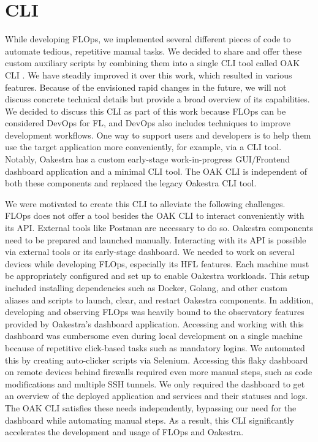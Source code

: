 \section{CLI}

While developing FLOps, we implemented several different pieces of code to automate tedious, repetitive manual tasks.
We decided to share and offer these custom auxiliary scripts by combining them into a single CLI tool called OAK CLI \cite{cli_code}.
We have steadily improved it over this work, which resulted in various features.
Because of the envisioned rapid changes in the future, we will not discuss concrete technical details but provide a broad overview of its capabilities.
We decided to discuss this CLI as part of this work because FLOps can be considered DevOps for FL, and DevOps also includes techniques to improve development workflows.
One way to support users and developers is to help them use the target application more conveniently, for example, via a CLI tool.
Notably, Oakestra has a custom early-stage work-in-progress GUI/Frontend dashboard application \cite{oakestra_dashboard} and a minimal CLI tool.
The OAK CLI is independent of both these components and replaced the legacy Oakestra CLI tool.

We were motivated to create this CLI to alleviate the following challenges.
FLOps does not offer a tool besides the OAK CLI to interact conveniently with its API.
External tools like Postman are necessary to do so.
Oakestra components need to be prepared and launched manually.
Interacting with its API is possible via external tools or its early-stage dashboard.
We needed to work on several devices while developing FLOps, especially its HFL features.
Each machine must be appropriately configured and set up to enable Oakestra workloads.
This setup included installing dependencies such as Docker, Golang, and other custom aliases and scripts to launch, clear, and restart Oakestra components.
In addition, developing and observing FLOps was heavily bound to the observatory features provided by Oakestra's dashboard application.
Accessing and working with this dashboard was cumbersome even during local development on a single machine because of repetitive click-based tasks such as mandatory logins.
We automated this by creating auto-clicker scripts via Selenium.
Accessing this flaky dashboard on remote devices behind firewalls required even more manual steps, such as code modifications and multiple SSH tunnels.
We only required the dashboard to get an overview of the deployed application and services and their statuses and logs.
The OAK CLI satisfies these needs independently, bypassing our need for the dashboard while automating manual steps.
As a result, this CLI significantly accelerates the development and usage of FLOps and Oakestra.

